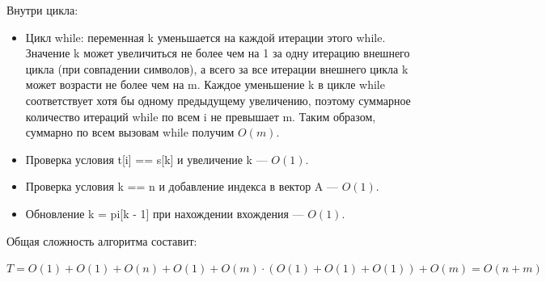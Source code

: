 \documentclass[otchet]{SCWorks}
\begin{document}
Внутри цикла:
\begin{itemize}
\item Цикл while: переменная k уменьшается на каждой итерации этого while.
Значение k может увеличиться не более чем на 1 за одну итерацию внешнего цикла (при совпадении символов),
а всего за все итерации внешнего цикла k может возрасти не более чем на m. Каждое уменьшение k в цикле while
соответствует хотя бы одному предыдущему увеличению, поэтому суммарное количество итераций while по всем i
не превышает m. Таким образом, суммарно по всем вызовам while получим $O(m)$.
\item Проверка условия t[i] == s[k] и увеличение k — $O(1)$.
\item Проверка условия k == n и добавление индекса в вектор A — $O(1)$.
\item Обновление k = pi[k - 1] при нахождении вхождения — $O(1)$.
\end{itemize}

Общая сложность алгоритма составит:

$T = O(1) + O(1) + O(n) + O(1) + O(m) \cdot (O(1) + O(1) + O(1)) + O(m) = O(n + m)$
\end{document}
